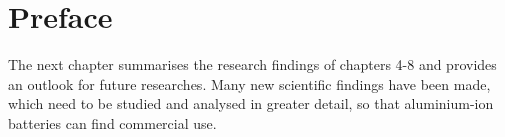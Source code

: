 \section*{Preface}
The next chapter summarises the research findings of chapters 4-8 and provides an outlook for future researches. Many new scientific findings have been made, which need to be studied and analysed in greater detail, so that aluminium-ion batteries can find commercial use.

